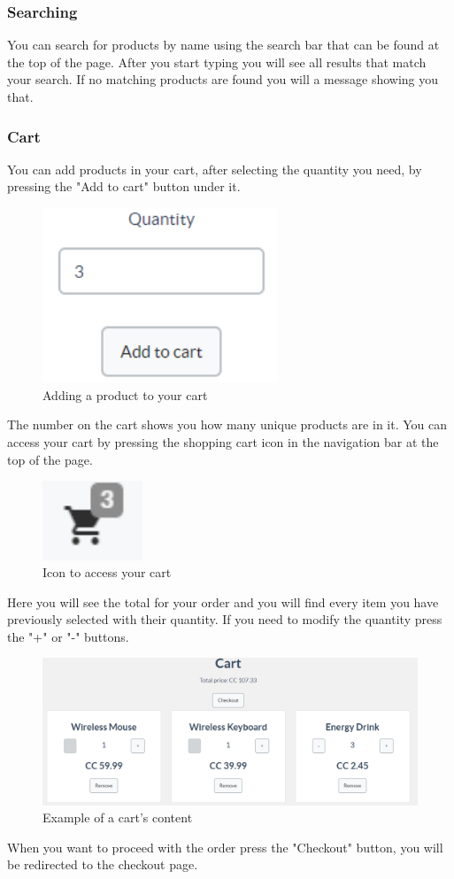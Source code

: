 		\subsubsection{Searching}
		You can search for products by name using the search bar that can be found 
		at the top of the page. After you start typing you will 
		see all results that match your search. If no matching products are 
		found you will a message showing you that.
%		
		\subsubsection{Cart}
		You can add products in your cart, after selecting the quantity you need, 
		by pressing the "Add to cart" button under it.
	\begin{figure}[H]
		\includegraphics[width=7cm]{res/images/add_to_cart.png}
		\centering
		\caption{Adding a product to your cart}
	\end{figure}
	\noindent The number on the cart shows you how many unique products are 
	in it. You can access your cart by pressing the shopping cart icon in 
	the navigation bar at the top of the page.
	\begin{figure}[H]
		\includegraphics[width=3cm]{res/images/cart_icon.png}
		\centering
		\caption{Icon to access your cart}
	\end{figure}
	\noindent Here you will see the total for your order and you will find 
	every item you have previously selected with their quantity. If you 
	need to modify the quantity press the "+" or "-" buttons.
	\begin{figure}[H]
		\includegraphics[width=15cm]{res/images/cart_example.png}
		\centering
		\caption{Example of a cart's content}
	\end{figure}
	\noindent When you want to proceed with the order press the "Checkout" button, 
	you will be redirected to the checkout page.
